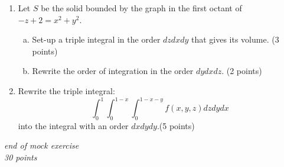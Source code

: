 \documentclass{article}
\begin{document}
\begin{enumerate}[1.]
    \item{Let $S$ be the solid bounded by the graph in the first octant of $-z+2=x^2+y^2$.}
    \vspace{-0.5em}
        \begin{enumerate}[a.]
            \item{Set-up a triple integral in the order $dzdxdy$ that gives its volume.} \hfill (3 points)
            \item{Rewrite the order of integration in the order $dydxdz$.} \hfill (2 points)
        \end{enumerate}
        \vspace{6cm}
    \item{Rewrite the triple integral:
    \[\int_{0}^{1} \int_{0}^{1-x} \int_{0}^{1-x-y} f(x,y,z) dzdydx\]
    into the integral with an order $dxdydy$.}\hfill (5 points)
\end{enumerate}

\vfill

\begin{center}
    \textit{end of mock exercise} \\
    \textit{30 points}
\end{center}
\end{document}
